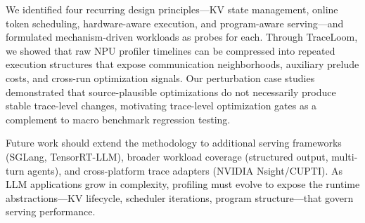 \documentclass[conference]{IEEEtran}
\begin{document}
We identified four recurring design principles---KV state management, online
token scheduling, hardware-aware execution, and program-aware serving---and
formulated mechanism-driven workloads as probes for each. Through TraceLoom,
we showed that raw NPU profiler timelines can be compressed into repeated
execution structures that expose communication neighborhoods, auxiliary
prelude costs, and cross-run optimization signals. Our perturbation case
studies demonstrated that source-plausible optimizations do not necessarily
produce stable trace-level changes, motivating trace-level optimization gates
as a complement to macro benchmark regression testing.

Future work should extend the methodology to additional serving frameworks
(SGLang, TensorRT-LLM), broader workload coverage (structured output,
multi-turn agents), and cross-platform trace adapters (NVIDIA Nsight/CUPTI).
As LLM applications grow in complexity, profiling must evolve to expose the
runtime abstractions---KV lifecycle, scheduler iterations, program
structure---that govern serving performance.
\end{document}
